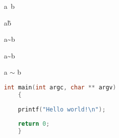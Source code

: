 \documentclass{ctexart}
\begin{document}
    
a~b

a\~b

a\~{}b

a\textasciitilde b

a $\sim$ b

\begin{lstlisting}[language=C]
    int main(int argc, char ** argv)
    {
    
    printf("Hello world!\n");
    
    return 0;
    }
    \end{lstlisting}
\end{document}
